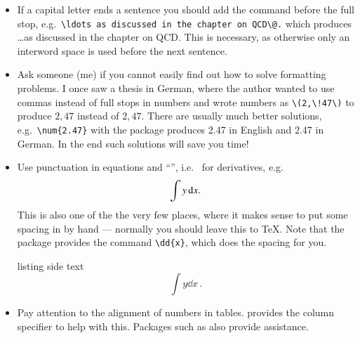 \begin{itemize}
\item If a capital letter ends a sentence you should add the
  command  before the full stop, e.g.\
  \verb|\ldots as discussed in the chapter on QCD\@.|
  which produces \ldots as discussed in the chapter on QCD\@.
  This is necessary, as otherwise only an interword space is used
  before the next sentence.

\item Ask someone (me) if you cannot easily find out how to solve
  formatting problems. I once saw a thesis in German, where the
  author wanted to use commas instead of full stops in numbers and
  wrote numbers as \verb+\(2,\!47\)+ to produce \(2,\!47\) instead of
  \(2,47\). There are usually much better solutions, e.g.\
  \verb+\num{2.47}+ with the  package produces
  \num{2.47} in English and \foreignlanguage{ngerman}{\num{2.47}} in
  German. In the end such solutions will save you time!

\item Use punctuation in equations and \enquote{\dif}, i.e.\  for
  derivatives, e.g.
  \begin{equation*}
    \int y\,\text{d} x.
  \end{equation*}
  This is also one of the the very few places, where it makes sense
  to put some spacing in by hand --- normally you should leave this to \TeX.
  Note that the \Package{physics} package provides the command \verb|\dd{x}|,
  which does the spacing for you.
\begin{tcblisting}{listing side text}
\begin{equation*}
  \int y \dd{x}\,.
\end{equation*}      
\end{tcblisting}

\item Pay attention to the alignment of numbers in
  tables.  provides the  column specifier to
  help with this. Packages such as  also provide assistance.
\end{itemize}

